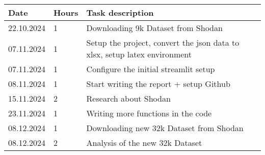 \documentclass[11pt,a4paper]{article}
\begin{document}
\begin{table}[H]
\centering
\begin{tabular}{|l|l|l|}
\hline
\textbf{Date} & \textbf{Hours} & \textbf{Task description} \\ \hline
22.10.2024 & 1 & Downloading 9k Dataset from Shodan \\ \hline
07.11.2024 & 1 & Setup the project, convert the json data to xlsx, setup latex environment \\ \hline
07.11.2024 & 1 & Configure the initial streamlit setup \\ \hline
08.11.2024 & 1 & Start writing the report + setup Github \\ \hline
15.11.2024 & 2 & Research about Shodan\\ \hline
23.11.2024 & 1 & Writing more functions in the code\\ \hline
08.12.2024 & 1 & Downloading new 32k Dataset from Shodan \\ \hline
08.12.2024 & 2 & Analysis of the new 32k Dataset \\ \hline

\end{tabular}
\end{table}

\newpage
\end{document}
